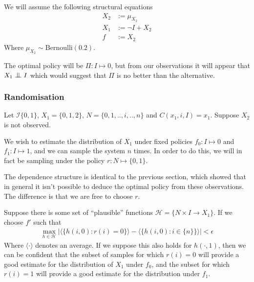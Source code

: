 We will assume the following structural equations
\begin{align*}
    X_2 &:= \mu_{X_2}\\
    X_1 &:= \neg I + X_2 \\
    f   &:= X_2
\end{align*}
Where $\mu_{X_2}\sim \mathrm{Bernoulli}(0.2)$.

The optimal policy will be $\Pi:I\mapsto 0$, but from our observations it will appear that $X_1 \CI I$ which would suggest that $\Pi$ is no better than the alternative.

\subsubsection{Randomisation}
Let $\mathcal{I}\{0,1\}$, $X_1=\{0,1,2\}$, $N=\{0,1,..,i,..,n\}$ and $C(x_1,i,I)=x_1$. Suppose $X_2$ is not observed.

We wish to estimate the distribution of $X_1$ under fixed policies $f_0:I\mapsto 0$ and $f_1:I\mapsto 1$, and we can sample the system $n$ times. In order to do this, we will in fact be sampling under the policy $r:N\mapsto \{0,1\}$.

\begin{center}
\end{center}

The dependence structure is identical to the previous section, which showed that in general it isn't possible to deduce the optimal policy from these observations. The difference is that we are free to choose $r$.

Suppose there is some set of ``plausible'' functions $\mathcal{H}=\{N\times I\to X_1\}$. If we choose $f'$ such that 
\begin{align}
    \max_{h\in\mathcal{H}} \left| \langle \{h(i,0):r(i)=0\}\rangle - \langle \{h(i,0):i\in\{n\}\} \rangle \right| < \epsilon \label{eq:bin_random}
\end{align}
Where $\langle\cdot\rangle$ denotes an average. If we suppose this also holds for $h(\cdot,1)$, then we can be confident that the subset of samples for which $r(i)=0$ will provide a good estimate for the distribution of $X_1$ under $f_0$, and the subset for which $r(i)=1$ will provide a good estimate for the distribution under $f_1$.

